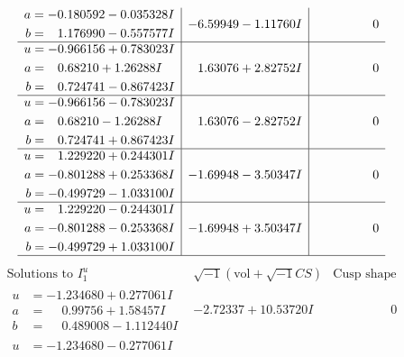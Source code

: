 \documentclass[1p]{elsarticle_modified}
\theoremstyle{definition}
\newcommand{\I}{\sqrt{-1}}
\begin{document}
$$\begin{array}{c|c|c}
\begin{aligned}
a &= -0.180592 - 0.035328 I \\
b &= \phantom{-}1.176990 - 0.557577 I\end{aligned}
 & -6.59949 - 1.11760 I & \phantom{-0.000000 } 0 \\ \hline\begin{aligned}
u &= -0.966156 + 0.783023 I \\
a &= \phantom{-}0.68210 + 1.26288 I \\
b &= \phantom{-}0.724741 - 0.867423 I\end{aligned}
 & \phantom{-}1.63076 + 2.82752 I & \phantom{-0.000000 } 0 \\ \hline\begin{aligned}
u &= -0.966156 - 0.783023 I \\
a &= \phantom{-}0.68210 - 1.26288 I \\
b &= \phantom{-}0.724741 + 0.867423 I\end{aligned}
 & \phantom{-}1.63076 - 2.82752 I & \phantom{-0.000000 } 0 \\ \hline\begin{aligned}
u &= \phantom{-}1.229220 + 0.244301 I \\
a &= -0.801288 + 0.253368 I \\
b &= -0.499729 - 1.033100 I\end{aligned}
 & -1.69948 - 3.50347 I & \phantom{-0.000000 } 0 \\ \hline\begin{aligned}
u &= \phantom{-}1.229220 - 0.244301 I \\
a &= -0.801288 - 0.253368 I \\
b &= -0.499729 + 1.033100 I\end{aligned}
 & -1.69948 + 3.50347 I & \phantom{-0.000000 } 0\\
 \hline 
 \end{array}$$\newpage$$\begin{array}{c|c|c}  
\text{Solutions to }I^u_{1}& \I (\text{vol} + \sqrt{-1}CS) & \text{Cusp shape}\\
 \hline 
\begin{aligned}
u &= -1.234680 + 0.277061 I \\
a &= \phantom{-}0.99756 + 1.58457 I \\
b &= \phantom{-}0.489008 - 1.112440 I\end{aligned}
 & -2.72337 + 10.53720 I & \phantom{-0.000000 } 0 \\ \hline\begin{aligned}
u &= -1.234680 - 0.277061 I \\

\end{aligned}
\end{array}$$
\end{document}
